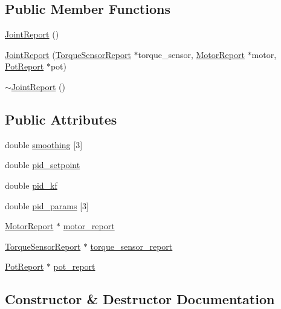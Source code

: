 \subsection*{Public Member Functions}
\begin{DoxyCompactItemize}
\item 
\hyperlink{classJointReport_a21eed5b1126735417d01cc4a326d1b79}{Joint\+Report} ()
\item 
\hyperlink{classJointReport_ac874979d988d2e5683b11a712e82e7a6}{Joint\+Report} (\hyperlink{classTorqueSensorReport}{Torque\+Sensor\+Report} $\ast$torque\+\_\+sensor, \hyperlink{classMotorReport}{Motor\+Report} $\ast$motor, \hyperlink{classPotReport}{Pot\+Report} $\ast$pot)
\item 
\hyperlink{classJointReport_af3c70552ecc49642ca25cc6c2a3f788e}{$\sim$\+Joint\+Report} ()
\end{DoxyCompactItemize}
\subsection*{Public Attributes}
\begin{DoxyCompactItemize}
\item 
double \hyperlink{classJointReport_a6419b87cfff8248af1432d39e7fc6469}{smoothing} \mbox{[}3\mbox{]}
\item 
double \hyperlink{classJointReport_a6d4c882a17785aa8a7ccbe1c890be21c}{pid\+\_\+setpoint}
\item 
double \hyperlink{classJointReport_a8f030d25081ce0bc99a8930151d501e8}{pid\+\_\+kf}
\item 
double \hyperlink{classJointReport_ae809215b70518e4102e467b3c03669ce}{pid\+\_\+params} \mbox{[}3\mbox{]}
\item 
\hyperlink{classMotorReport}{Motor\+Report} $\ast$ \hyperlink{classJointReport_af7ba80db7187b82a67a0f3e3ac632159}{motor\+\_\+report}
\item 
\hyperlink{classTorqueSensorReport}{Torque\+Sensor\+Report} $\ast$ \hyperlink{classJointReport_a6aa2fd9a4b9d74c5d5205ecf774693d8}{torque\+\_\+sensor\+\_\+report}
\item 
\hyperlink{classPotReport}{Pot\+Report} $\ast$ \hyperlink{classJointReport_a03e9ae63a3dd14d017288fefea316aff}{pot\+\_\+report}
\end{DoxyCompactItemize}


\subsection{Constructor \& Destructor Documentation}
